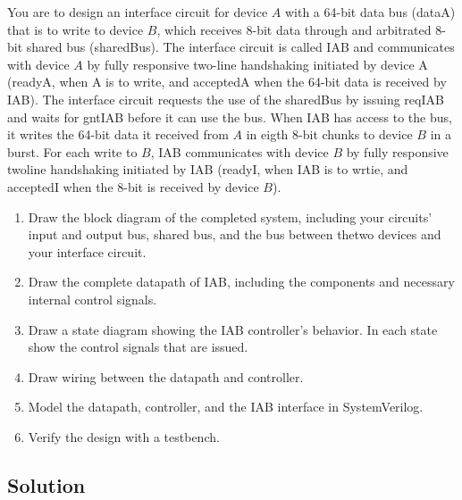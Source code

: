 \documentclass[../main.tex]{subfiles}
\begin{document}
You are to design an interface circuit for device $A$ with a 64-bit data bus (dataA) that is to write to device $B$, which receives 8-bit data through and arbitrated 8-bit shared bus (sharedBus). The interface circuit is called IAB and communicates with device $A$ by fully responsive two-line handshaking initiated by device A (readyA, when A is to write, and acceptedA when the 64-bit data is received by IAB). The interface circuit requests the use of the sharedBus by issuing reqIAB and waits for gntIAB before it can use the bus. When IAB has access to the bus, it writes the 64-bit data it received from $A$ in eigth 8-bit chunks to device $B$ in a burst. For each write to $B$, IAB communicates with device $B$ by fully responsive twoline handshaking initiated by IAB (readyI, when IAB is to wrtie, and acceptedI when the 8-bit is received by device $B$).

\begin{enumerate}
    \item Draw the block diagram of the completed system, including your circuits' input and output bus, shared bus, and the bus between thetwo devices and your interface circuit.
    \item Draw the complete datapath of IAB, including the components and necessary internal control signals.
    \item Draw a state diagram showing the IAB controller's behavior. In each state show the control signals that are issued.
    \item Draw wiring between the datapath and controller.
    \item Model the datapath, controller, and the IAB interface in SystemVerilog.
    \item Verify the design with a testbench.
\end{enumerate}

\subsection*{Solution}
\end{document}
